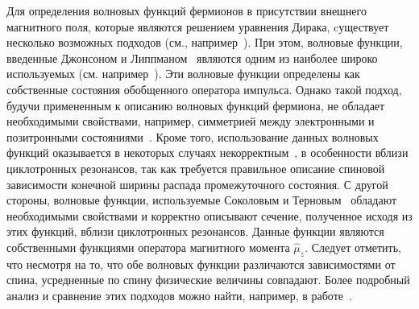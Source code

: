 Для определения волновых функций фермионов в присутствии внешнего магнитного поля, которые являются решением уравнения Дирака, cуществует  несколько возможных подходов  (см., 
например~\cite{Johnson:1949,Akhiezer:1965,Sokolov:1968,Melrose:1983a,Sokolov:1986,KM_Book_2003,Bhattacharya:2004,Balantsev:2011,KM_Book_2013}).
При этом, волновые функции, введенные Джонсоном и Липпманом~\cite{Johnson:1949} являются одним из наиболее широко используемых (см. например~\cite{Canuto:1975,Harding:1991,Suh:1999,Gonthier:2000,Jones:2010,Melrose:2020}). 
Эти волновые функции определены как собственные состояния обобщенного оператора импульса. Однако такой подход, будучи примененным к описанию волновых функций фермиона, не обладает необходимыми свойствами, например, симметрией между электронными и позитронными состояниями~\cite{Melrose:1983}. Кроме того, использование данных волновых функций оказывается в некоторых случаях некорректным~\cite{Graziani:1993,Gonthier:2014}, в особенности вблизи циклотронных резонансов, так как требуется правильное описание спиновой зависимости конечной ширины распада промежуточного состояния. 
С другой стороны, волновые функции, используемые Соколовым и Терновым~\cite{Sokolov:1986} обладают необходимыми свойствами и корректно описывают сечение, полученное исходя из этих функций, вблизи циклотронных резонансов. Данные функции являются собственными функциями оператора магнитного момента $\hat{\mu}_z$. Следует отметить, что несмотря на то, что обе волновых функции различаются зависимостями от спина, усредненные по спину физические величины совпадают. Более подробный анализ и сравнение этих подходов можно найти, например, в работе~\cite{Gonthier:2014}.